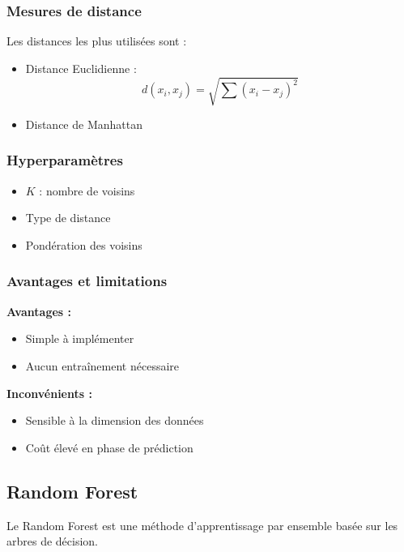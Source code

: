 \documentclass[12pt,a4paper]{article}
\begin{document}
    \subsubsection{Mesures de distance}

    Les distances les plus utilisées sont :
    \begin{itemize}
        \item Distance Euclidienne :
        \[
        d(x_i, x_j) = \sqrt{\sum (x_i - x_j)^2}
        \]
        \item Distance de Manhattan
    \end{itemize}

    \subsubsection{Hyperparamètres}

    \begin{itemize}
        \item \(K\) : nombre de voisins
        \item Type de distance
        \item Pondération des voisins
    \end{itemize}

    \subsubsection{Avantages et limitations}

    \textbf{Avantages :}
    \begin{itemize}
        \item Simple à implémenter
        \item Aucun entraînement nécessaire
    \end{itemize}

    \textbf{Inconvénients :}
    \begin{itemize}
        \item Sensible à la dimension des données
        \item Coût élevé en phase de prédiction
    \end{itemize}

    \subsection{Random Forest}

    Le Random Forest est une méthode d’apprentissage par ensemble basée sur les arbres de décision.
\end{document}
